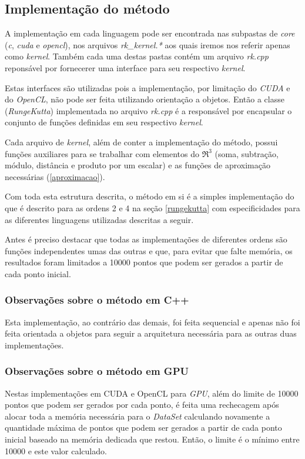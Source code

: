   \subsection{Implementação do método}
  A implementação em cada linguagem pode ser encontrada nas subpastas de \textit{core} (\textit{c}, \textit{cuda} e \textit{opencl}), nos arquivos \textit{rk\_kernel.*} aos quais iremos nos referir apenas como \textit{kernel}. Também cada uma destas pastas contém um arquivo \textit{rk.cpp} reponsável por fornecerer uma interface para seu respectivo \textit{kernel}.
  
  Estas interfaces são utilizadas pois a implementação, por limitação do \textit{CUDA} e do \textit{OpenCL}, não pode ser feita utilizando orientação a objetos. Então a classe (\textit{RungeKutta}) implementada no arquivo \textit{rk.cpp} é a responsável por encapsular o conjunto de funções definidas em seu respectivo \textit{kernel}.

  Cada arquivo de \textit{kernel}, além de conter a implementação do método, possui funções auxiliares para se trabalhar com elementos do $\Re ^{3}$ (soma, subtração, módulo, distância e produto por um escalar) e as funções de aproximação necessárias (\ref{aproximacao}).
  
  Com toda esta estrutura descrita, o método em si é a simples implementação do que é descrito para as ordens 2 e 4 na seção \ref{rungekutta} com especificidades para as diferentes linguagens utilizadas descritas a seguir.
  
  Antes é preciso destacar que todas as implementações de diferentes ordens são funções independentes umas das outras e que, para evitar que falte memória, os resultados foram limitados a 10000 pontos que podem ser gerados a partir de cada ponto inicial.
  
    \subsubsection{Observações sobre o método em C++}
    Esta implementação, ao contrário das demais, foi feita sequencial e apenas não foi feita orientada a objetos para seguir a arquitetura necessária para as outras duas implementações.
    
    \subsubsection{Observações sobre o método em GPU}
    Nestas implementações em CUDA e OpenCL para \textit{GPU}, além do limite de 10000 pontos que podem ser gerados por cada ponto, é feita uma rechecagem após alocar toda a memória necessária para o \textit{DataSet} calculando novamente a quantidade máxima de pontos que podem ser gerados a partir de cada ponto inicial baseado na memória dedicada que restou. Então, o limite é o mínimo entre 10000 e este valor calculado.

